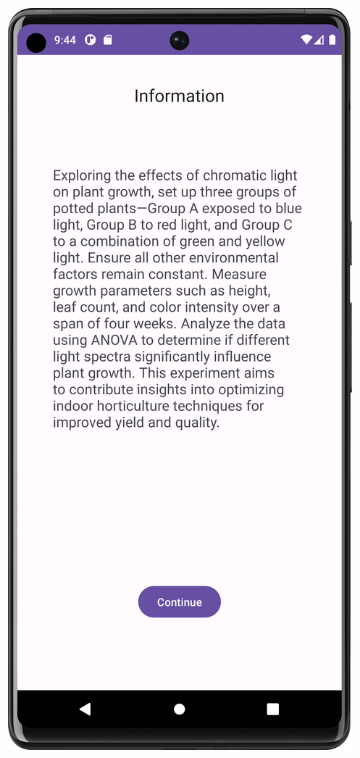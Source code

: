 \vspace{1cm}

\begin{figure}[htbp]
    \centering
    \begin{subfigure}[b]{0.25\textwidth}
        \centering
        \includegraphics[width=\textwidth]{content/07_evaluation_of_the_solution/Screenshot_T10a.png}

\end{subfigure}
\end{figure}
